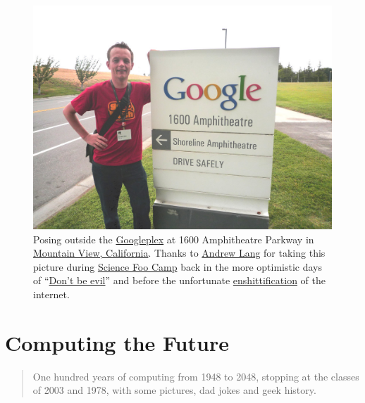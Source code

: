 \documentclass[
  12pt,
]{book}
\begin{document}
\begin{figure}

{\centering \includegraphics[width=1\linewidth]{images/dooncan-hool} 

}

\caption{Posing outside the \href{https://en.wikipedia.org/wiki/Googleplex}{Googleplex} at 1600 Amphitheatre Parkway in \href{https://en.wikipedia.org/wiki/Mountain_View,_California}{Mountain View, California}. Thanks to \href{https://www.linkedin.com/in/andrewlang}{Andrew Lang} for taking this picture during \href{https://en.wikipedia.org/wiki/Science_Foo_Camp}{Science Foo Camp} back in the more optimistic days of ``\href{https://en.wikipedia.org/wiki/Don\%27t_be_evil}{Don't be evil}'' \citep{dontbeevil, scifoo2007, scifoo2009} and before the unfortunate \href{https://en.wikipedia.org/wiki/Enshittification}{enshittification} of the internet. \citep{internetcon}}\label{fig:unnamed-chunk-10}
\end{figure}



\hypertarget{appendix-postscript}{%
\appendix}


\hypertarget{mastersofscience}{%
\chapter{Computing the Future}\label{mastersofscience}}

\begin{quote}
One hundred years of computing from 1948 to 2048, stopping at the classes of 2003 and 1978, with
some pictures, dad jokes and geek history.
\end{quote}
\end{document}
